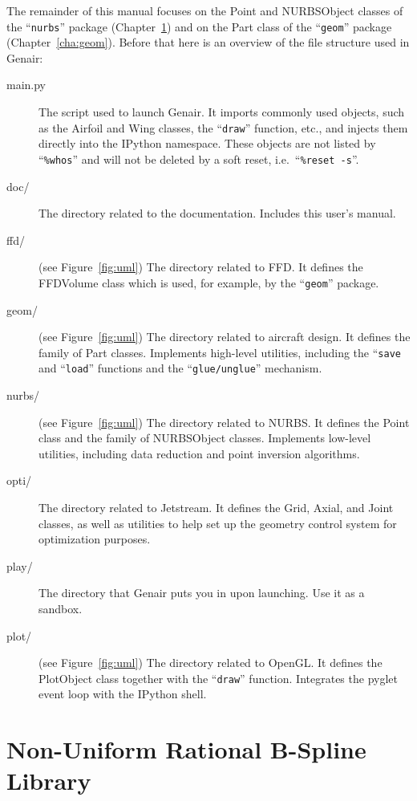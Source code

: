 \documentclass[]{article}
\begin{document}
The remainder of this manual focuses on the Point and NURBSObject 
classes of the ``\texttt{nurbs}'' package (Chapter~\ref{cha:nurbs}) and 
on the Part class of the ``\texttt{geom}'' package 
(Chapter~\ref{cha:geom}).  Before that here is an overview of the file 
structure used in Genair:
\begin{description}
  \item[main.py] The script used to launch Genair.  It imports commonly 
    used objects, such as the Airfoil and Wing classes, the 
    ``\texttt{draw}'' function, etc., and injects them directly into the 
    IPython namespace.  These objects are not listed by 
    ``\texttt{\%whos}'' and will not be deleted by a soft reset, i.e.\ 
    ``\texttt{\%reset -s}''.
  \item[doc/] The directory related to the documentation.  Includes this 
    user's manual.
  \item[ffd/] (see Figure~\ref{fig:uml}) The directory related to FFD.  
    It defines the FFDVolume class which is used, for example, by the 
    ``\texttt{geom}'' package.
  \item[geom/] (see Figure~\ref{fig:uml}) The directory related to 
    aircraft design.  It defines the family of Part classes.  Implements 
    high-level utilities, including the ``\texttt{save} and 
    ``\texttt{load}'' functions and the ``\texttt{glue/unglue}'' 
    mechanism.
  \item[nurbs/] (see Figure~\ref{fig:uml}) The directory related to 
    NURBS.  It defines the Point class and the family of NURBSObject 
    classes.  Implements low-level utilities, including data reduction 
    and point inversion algorithms.
  \item[opti/] The directory related to Jetstream.  It defines the Grid, 
    Axial, and Joint classes, as well as utilities to help set up the 
    geometry control system for optimization purposes.
  \item[play/] The directory that Genair puts you in upon launching.  
    Use it as a sandbox.
  \item[plot/] (see Figure~\ref{fig:uml}) The directory related to 
    OpenGL.  It defines the PlotObject class together with the 
    ``\texttt{draw}'' function.  Integrates the pyglet event loop with 
    the IPython shell.
\end{description}


\section{Non-Uniform Rational B-Spline Library}
\label{cha:nurbs}
\end{document}
